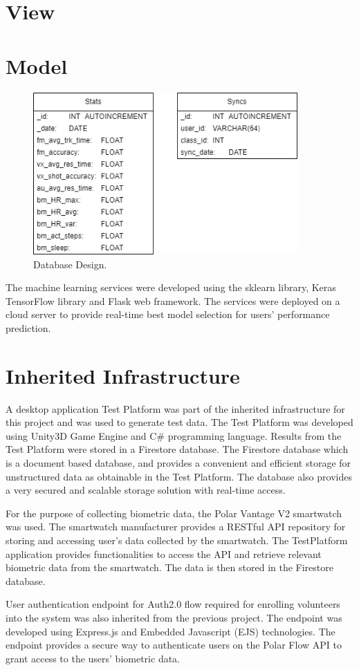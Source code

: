 \section{View}

\section{Model}

\begin{figure}[h!]
    \includegraphics[width=0.9\textwidth]{images/db_schema.png}
    \caption{Database Design.}
    \label{image:databaseDesign}
\end{figure}


The machine learning services were developed using the 
sklearn library, Keras TensorFlow library and Flask web framework. The services were deployed on a cloud server to provide real-time best
model selection for users' performance prediction.

\section{Inherited Infrastructure}

A desktop application Test Platform was part of the inherited infrastructure for this project and was used to generate test data.
The Test Platform was developed using Unity3D Game Engine and C\# programming language. Results from the Test Platform were stored in 
a Firestore database. The Firestore database which is a document based database, and provides a convenient and efficient storage for 
unstructured data as obtainable in the Test Platform. The database also provides a very secured and scalable storage solution with 
real-time access.

For the purpose of collecting biometric data, the Polar Vantage V2 smartwatch was used. The smartwatch manufacturer provides a RESTful API
repository for storing and accessing user's data collected by the smartwatch. The TestPlatform application provides functionalities to 
access the API and retrieve relevant biometric data from the smartwatch. The data is then stored in the Firestore database.

User authentication endpoint for Auth2.0 flow required for enrolling volunteers into the system was also inherited from the previous project. 
The endpoint was developed using Express.js and Embedded Javascript (EJS) technologies. The endpoint provides a secure way to authenticate
users on the Polar Flow API to grant access to the users' biometric data. 